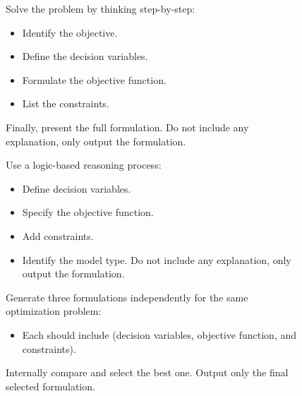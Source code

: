 \documentclass[review,12pt]{elsarticle}
\begin{document}
\begin{figure}[htbp]
{{\begin{tcolorbox}
{%
\begin{tcolorbox}[colframe=purple!50!black, colback=purple!10, title=\textbf{Prompt 3: Chain-of-Thought}, boxrule=0.3pt, arc=1pt, top=0pt, bottom=0pt]
Solve the problem by thinking step-by-step:\vspace{-6mm}
\begin{itemize}
    \item Identify the objective.\vspace{-6mm}
    \item Define the decision variables.\vspace{-6mm}
    \item Formulate the objective function.\vspace{-6mm}
    \item List the constraints.\vspace{-6mm}
\end{itemize}
Finally, present the full formulation. Do not include any explanation, only output the formulation.
\end{tcolorbox}

\begin{tcolorbox}[colframe=purple!50!black, colback=purple!10, title=\textbf{Prompt 4: Program-of-Thought}, boxrule=0.3pt, arc=1pt, top=0pt, bottom=0pt] 
Use a logic-based reasoning process:\vspace{-6mm}
\begin{itemize}
    \item Define decision variables.\vspace{-6mm}
    \item Specify the objective function.\vspace{-6mm}
    \item Add constraints.\vspace{-6mm}
    \item Identify the model type. Do not include any explanation, only output the formulation.
\end{itemize} 
\end{tcolorbox}

\begin{tcolorbox}[colframe=purple!50!black, colback=purple!10, title=\textbf{Prompt 5: Self-Consistency}, boxrule=0.3pt, arc=1pt, top=0pt, bottom=0pt]  
Generate three formulations independently for the same optimization problem:\vspace{-6mm}
\begin{itemize}
    \item Each should include (decision variables, objective function, and constraints).\vspace{-6mm}
\end{itemize}
Internally compare and select the best one.
Output only the final selected formulation. 
\vspace{-3mm} 


\end{tcolorbox}}
\end{tcolorbox}}}
\end{figure}
\end{document}
